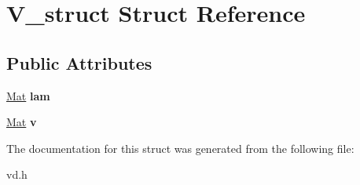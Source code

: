 \hypertarget{structV__struct}{}\section{V\+\_\+struct Struct Reference}
\label{structV__struct}
\subsection*{Public Attributes}
\begin{DoxyCompactItemize}
\item 
\mbox{\label{structV__struct_a56d1655953ba5bee519bd62d992abfff}} 
\mbox{\hyperlink{aux_8h_aa1fe91b8cd36c618282eb0d548690c4c}{Mat}} {\bfseries lam}
\item 
\mbox{\label{structV__struct_aa78c83185af94c1df09f59a689881cd9}} 
\mbox{\hyperlink{aux_8h_aa1fe91b8cd36c618282eb0d548690c4c}{Mat}} {\bfseries v}
\end{DoxyCompactItemize}


The documentation for this struct was generated from the following file\+:\begin{DoxyCompactItemize}
\item 
vd.\+h\end{DoxyCompactItemize}
